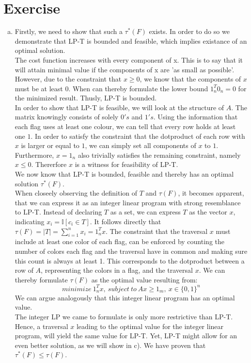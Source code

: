 \documentclass{article}
\newcounter{homeworkProblemCounter} %
\newcommand{\homeworkProblemName}{}
\newenvironment{homeworkProblem}[1][Exercise \arabic{homeworkProblemCounter}]{ %
\stepcounter{homeworkProblemCounter} %
\renewcommand{\homeworkProblemName}{#1} %
\section{\homeworkProblemName} %
}{
}
\begin{document}
\begin{homeworkProblem}
\begin{enumerate}[(a)]
\item
	Firstly, we need to show that such a \( \tau^{*}(F)\) exists. In order to do so we demonstrate that LP-T is bounded and feasible, which implies existance of an optimal solution. \\
	The cost function increases with every component of x. This is to say that it will attain minimal value if the components of x are 'as small as possible'. However, due to the constraint that \(x \geq 0 \), we know that the components of \(x\) must be at least \(0\). When can thereby formulate the lower bound \( 1_n^T 0_n = 0 \) for the minimized result. Thusly, LP-T is bounded. \\
	In order to show that LP-T is feasible, we will look at the structure of \(A\). The matrix knowingly consists of solely \(0's\) and \(1's\). Using the information that each flag uses at least one colour, we can tell that every row holds at least one \(1\). In order to satisfy the constraint that the dotproduct of each row with \(x\) is larger or equal to \(1\), we can simply set all components of \(x\) to \(1\). Furthermore, \(x = 1_n\) also trivially satisfies the remaining constraint, namely \(x \leq 0\). Thererfore \(x\) is a witness for feasibility of LP-T. \\
	We now know that LP-T is bounded, feasible and thereby has an optimal solution \( \tau^{*}(F) \). \\
	When closeely observing the definition of \( T\) and \(\tau(F)\), it becomes apparent, that we can express it as an integer linear program with strong resemblance to LP-T. Instead of declaring \(T\) as a set, we can express \(T\) as the vector \(x\), indicating \(x_i = \mathbb{I}[c_i \in T ]\). It follows directly that \( \tau(F) = |T| = \sum_{i=1}^{n} x_i = 1_n ^Tx \). The constraint that the traversal \(x\) must include at least one color of each flag, can be enforced by counting the number of colors each flag and the traversal have in common and making sure this count is always at least 1. This corresponds to the dotproduct between a row of \(A\), representing the colors in a flag, and the traversal \(x\). We can thereby formulate \(\tau(F)\) as the optimal value resulting from:
	\[ minimize\ 1_n^Tx,\ subject\ to\ Ax \geq 1_m,\ x \in \{0,1\}^n 
	\]
	We can argue analogously that this integer linear program has an optimal value. \\
	The integer LP we came to formulate is only more restrictive than LP-T. Hence, a traversal \(x\) leading to the optimal value for the integer linear program, will yield the same value for LP-T. Yet, LP-T might allow for an even better solution, as we will show in c). We have proven that \(\tau^{*}(F) \leq \tau(F)\).


\end{enumerate}
\end{homeworkProblem}
\end{document}
